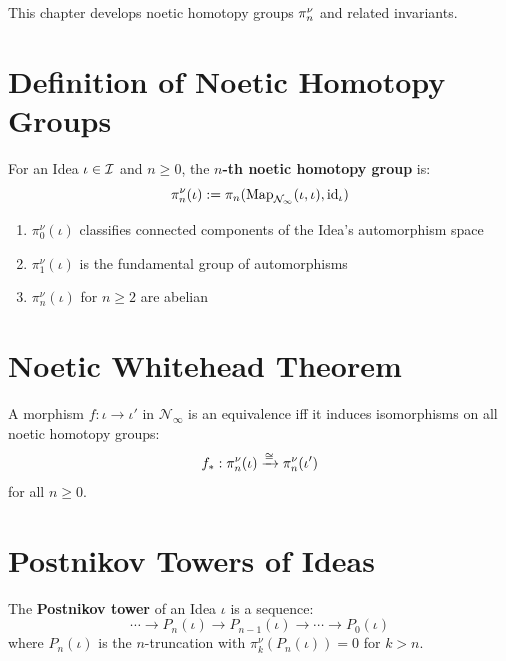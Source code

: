 \begin{tcolorbox}[colback=blue!5!white,colframe=blue!75!black,title=\vnewfour]
This chapter develops noetic homotopy groups $\pi^{\nu}_n$ and related
invariants.
\end{tcolorbox}

\section{Definition of Noetic Homotopy Groups}

\begin{definition}
\label{def:noetic-homotopy-groups}
For an Idea $\iota \in \mathcal{I}$ and $n \geq 0$, the \textbf{$n$-th noetic homotopy group} is:
\[
\pi^{\nu}_n(\iota) := \pi_n(\mathrm{Map}_{\mathcal{N}_\infty}(\iota, \iota), \mathrm{id}_\iota)
\]
\end{definition}

\begin{proposition}[Properties]
\label{prop:homotopy-properties}
\begin{enumerate}[label=(\roman*)]
  \item $\pi^\nu_0(\iota)$ classifies connected components of the Idea's automorphism space
  \item $\pi^\nu_1(\iota)$ is the fundamental group of automorphisms
  \item $\pi^\nu_n(\iota)$ for $n \geq 2$ are abelian
\end{enumerate}
\end{proposition}

\section{Noetic Whitehead Theorem}

\begin{theorem}
\label{thm:noetic-whitehead}
A morphism $f : \iota \to \iota'$ in $\mathcal{N}_\infty$ is an equivalence iff
it induces isomorphisms on all noetic homotopy groups:
\[
f_* : \pi^{\nu}_n(\iota) \xrightarrow{\cong} \pi^{\nu}_n(\iota')
\]
for all $n \geq 0$.
\end{theorem}

\section{Postnikov Towers of Ideas}

\begin{definition}
\label{def:postnikov-tower}
The \textbf{Postnikov tower} of an Idea $\iota$ is a sequence:
\[
\cdots \to P_n(\iota) \to P_{n-1}(\iota) \to \cdots \to P_0(\iota)
\]
where $P_n(\iota)$ is the $n$-truncation with $\pi^\nu_k(P_n(\iota)) = 0$ for $k > n$.
\end{definition}


